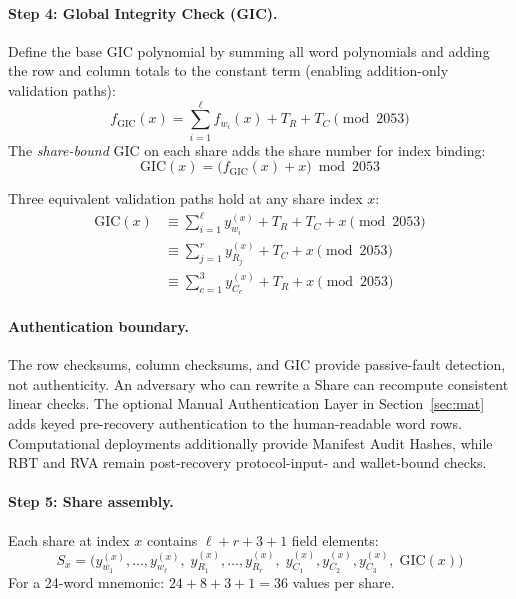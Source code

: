 \documentclass[11pt]{article}
\begin{document}
\paragraph{Step 4: Global Integrity Check (GIC).} Define the base GIC polynomial by summing all word polynomials and adding the row and column totals to the constant term (enabling addition-only validation paths):
\begin{equation}
    f_{\text{GIC}}(x) = \sum_{i=1}^{\ell} f_{w_i}(x) + T_R + T_C \pmod{2053} \label{eq:gicpoly}
\end{equation}
The \emph{share-bound} GIC on each share adds the share number for index binding:
\begin{equation}
    \text{GIC}(x) = \bigl(f_{\text{GIC}}(x) + x\bigr) \bmod 2053 \label{eq:printedgic}
\end{equation}

Three equivalent validation paths hold at any share index $x$:
\begin{align}
    \text{GIC}(x) &\equiv \sum_{i=1}^{\ell} y_{w_i}^{(x)} + T_R + T_C + x \pmod{2053} \label{eq:gic-words} \\
    &\equiv \sum_{j=1}^{r} y_{R_j}^{(x)} + T_C + x \pmod{2053} \label{eq:gic-rows} \\
    &\equiv \sum_{c=1}^{3} y_{C_c}^{(x)} + T_R + x \pmod{2053} \label{eq:gic-cols}
\end{align}

\paragraph{Authentication boundary.} The row checksums, column checksums, and GIC provide passive-fault detection, not authenticity. An adversary who can rewrite a Share can recompute consistent linear checks. The optional Manual Authentication Layer in Section~\ref{sec:mat} adds keyed pre-recovery authentication to the human-readable word rows. Computational deployments additionally provide Manifest Audit Hashes, while RBT and RVA remain post-recovery protocol-input- and wallet-bound checks.

\paragraph{Step 5: Share assembly.} Each share at index $x$ contains $\ell + r + 3 + 1$ field elements:
\[
    S_x = \bigl(y_{w_1}^{(x)}, \ldots, y_{w_\ell}^{(x)},\; y_{R_1}^{(x)}, \ldots, y_{R_r}^{(x)},\; y_{C_1}^{(x)}, y_{C_2}^{(x)}, y_{C_3}^{(x)},\; \text{GIC}(x)\bigr)
\]
For a 24-word mnemonic: $24 + 8 + 3 + 1 = 36$ values per share.
\end{document}
